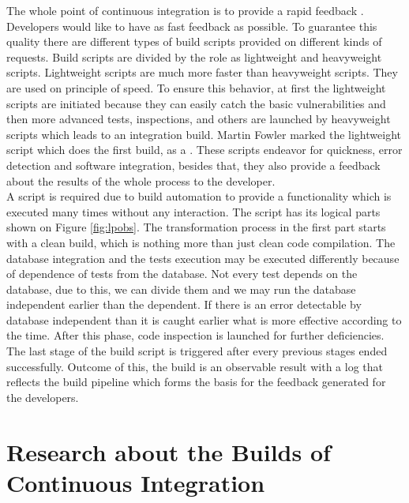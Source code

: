The whole point of continuous integration is to provide a rapid feedback \cite{MartinFowler}. Developers would like to have as fast feedback as possible. To guarantee this quality there are different types of build scripts provided on different kinds of requests. Build scripts are divided by the role as lightweight and heavyweight scripts. Lightweight scripts are much more faster than heavyweight scripts. They are used on principle of speed. To ensure this behavior, at first the lightweight scripts are initiated because they can easily catch the basic vulnerabilities and then more advanced tests, inspections, and others are launched by heavyweight scripts which leads to an integration build. Martin Fowler marked the lightweight script which does the first build, as a  \cite{MartinFowler}. These scripts endeavor for quickness, error detection and software integration, besides that, they also provide a feedback about the results of the whole process to the developer.\\

A script is required due to build automation to provide a  functionality which is executed many times without any interaction. The script has its logical parts shown on Figure \ref{fig:lpobs}. The transformation process in the first part starts with a clean build, which is nothing more than just clean code compilation. The database integration and the tests execution may be executed differently because of dependence of tests from the database. Not every test depends on the database, due to this, we can divide them and we may run the database independent earlier than the dependent. If there is an error detectable by database independent than it is caught earlier what is more effective according to the time. After this phase, code inspection is launched for further deficiencies. The last stage of the build script is triggered after every previous stages ended successfully. Outcome of this, the build is an observable result with a log that reflects the build pipeline which forms the basis for the feedback generated for the developers.

\section{Research about the Builds of Continuous Integration}

